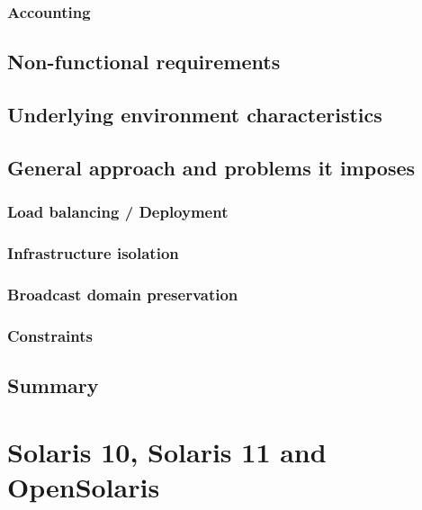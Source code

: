 \documentclass[11pt]{book}
\begin{document}
      \subsection{Accounting}  %


    \section{Non-functional requirements}

    \section{Underlying environment characteristics}

    \section{General approach and problems it imposes}

      \subsection{Load balancing / Deployment}

      \subsection{Infrastructure isolation}

      \subsection{Broadcast domain preservation}

      \subsection{Constraints}


    \section*{Summary}


  \chapter{Solaris 10, Solaris 11 and OpenSolaris}
  
\end{document}
